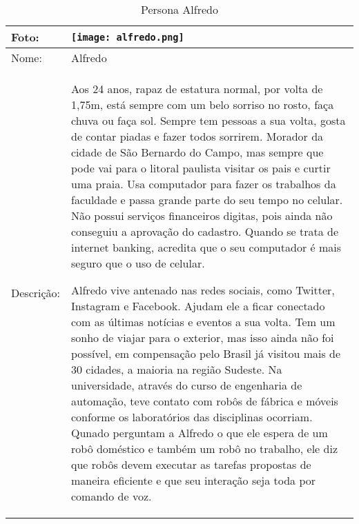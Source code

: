 \begin{table}[!ht]
	\caption{Persona Alfredo}
	\label{tab:alfredo}
	\centering
	\begin{tabular}{ m{2 cm} | m{13cm} }
		\hline
		Foto: & \rule{0cm}{2.7cm} \texttt{[image: alfredo.png]} \\
		\hline
		Nome: & Alfredo \\
		\hline
		Descrição: & Aos 24 anos, rapaz de estatura normal, por volta de 1,75m, está sempre com um belo sorriso no rosto, faça chuva ou faça sol. Sempre tem pessoas a sua volta, gosta de contar piadas e fazer todos sorrirem. Morador da cidade de São Bernardo do Campo, mas sempre que pode vai para o litoral paulista visitar os pais e curtir uma praia. Usa computador para fazer os trabalhos da faculdade e passa grande parte do seu tempo no celular. Não possui serviços financeiros digitas, pois ainda não conseguiu a aprovação do cadastro. Quando se trata de internet banking, acredita que o seu computador é mais seguro que o uso de celular.

		Alfredo vive antenado nas redes sociais, como Twitter, Instagram e Facebook. Ajudam ele a ficar conectado com as últimas notícias e eventos a sua volta. Tem um sonho de viajar para o exterior, mas isso ainda não foi possível, em compensação pelo Brasil já visitou mais de 30 cidades, a maioria na região Sudeste. Na universidade, através do curso de engenharia de automação, teve contato com robôs de fábrica e móveis conforme os laboratórios das disciplinas ocorriam. Qunado perguntam a Alfredo o que ele espera de um robô doméstico e também um robô no trabalho, ele diz que robôs devem executar as tarefas propostas de maneira eficiente e que seu interação seja toda por comando de voz.\\
		\hline
	\end{tabular}
\end{table}

